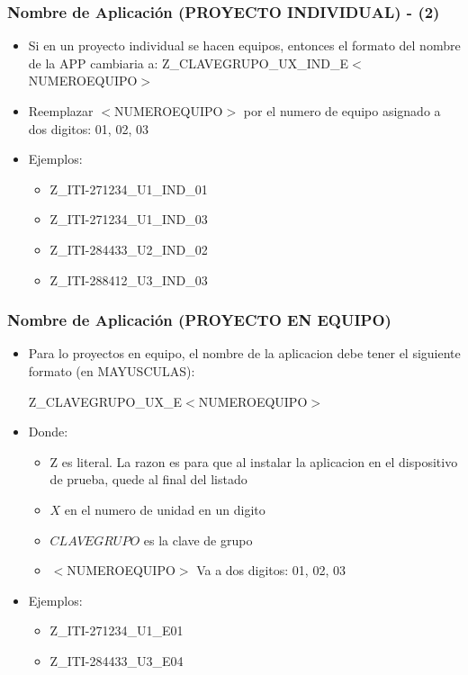 \begin{frame}
\frametitle{Nombre de Aplicaci\'on (PROYECTO INDIVIDUAL) - (2)}
\begin{itemize}
\item Si en un proyecto individual se hacen equipos, entonces el formato del nombre de la APP cambiaria a:
Z\_CLAVEGRUPO\_UX\_IND\_E$<$NUMEROEQUIPO$>$
\item Reemplazar $<$NUMEROEQUIPO$>$ por el numero de equipo asignado a dos digitos: 01, 02, 03
\item Ejemplos:
\begin{itemize}
\item Z\_ITI-271234\_U1\_IND\_01
\item Z\_ITI-271234\_U1\_IND\_03
\item Z\_ITI-284433\_U2\_IND\_02
\item Z\_ITI-288412\_U3\_IND\_03
\end{itemize}


\end{itemize}

\end{frame}



\begin{frame}
\frametitle{Nombre de Aplicaci\'on (PROYECTO EN EQUIPO)}
\begin{itemize}

\item Para lo proyectos en equipo, el nombre de la aplicacion debe tener el siguiente formato (en MAYUSCULAS):

 Z\_CLAVEGRUPO\_UX\_E$<$NUMEROEQUIPO$>$

\item Donde:
\begin{itemize}

\item Z es literal. La razon es para que al instalar la aplicacion en el dispositivo de prueba, quede al final del listado
\item $X$ en el numero de unidad en un digito
\item $CLAVEGRUPO$ es la clave de grupo
\item $<$NUMEROEQUIPO$>$ Va a dos digitos: 01, 02, 03
\end{itemize}

\item Ejemplos:
\begin{itemize}
\item Z\_ITI-271234\_U1\_E01
\item Z\_ITI-284433\_U3\_E04
\end{itemize}
\end{itemize}


\end{frame}



